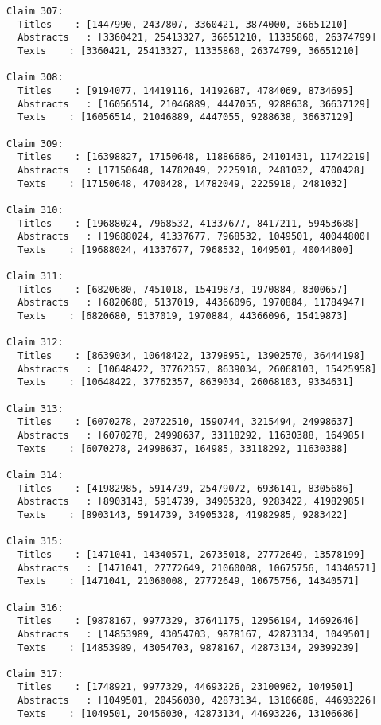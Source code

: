 \documentclass[11pt]{article}
\begin{document}
\begin{Verbatim}[commandchars=\\\{\}]
Claim 307:
  Titles    : [1447990, 2437807, 3360421, 3874000, 36651210]
  Abstracts   : [3360421, 25413327, 36651210, 11335860, 26374799]
  Texts    : [3360421, 25413327, 11335860, 26374799, 36651210]

Claim 308:
  Titles    : [9194077, 14419116, 14192687, 4784069, 8734695]
  Abstracts   : [16056514, 21046889, 4447055, 9288638, 36637129]
  Texts    : [16056514, 21046889, 4447055, 9288638, 36637129]

Claim 309:
  Titles    : [16398827, 17150648, 11886686, 24101431, 11742219]
  Abstracts   : [17150648, 14782049, 2225918, 2481032, 4700428]
  Texts    : [17150648, 4700428, 14782049, 2225918, 2481032]

Claim 310:
  Titles    : [19688024, 7968532, 41337677, 8417211, 59453688]
  Abstracts   : [19688024, 41337677, 7968532, 1049501, 40044800]
  Texts    : [19688024, 41337677, 7968532, 1049501, 40044800]

Claim 311:
  Titles    : [6820680, 7451018, 15419873, 1970884, 8300657]
  Abstracts   : [6820680, 5137019, 44366096, 1970884, 11784947]
  Texts    : [6820680, 5137019, 1970884, 44366096, 15419873]

Claim 312:
  Titles    : [8639034, 10648422, 13798951, 13902570, 36444198]
  Abstracts   : [10648422, 37762357, 8639034, 26068103, 15425958]
  Texts    : [10648422, 37762357, 8639034, 26068103, 9334631]

Claim 313:
  Titles    : [6070278, 20722510, 1590744, 3215494, 24998637]
  Abstracts   : [6070278, 24998637, 33118292, 11630388, 164985]
  Texts    : [6070278, 24998637, 164985, 33118292, 11630388]

Claim 314:
  Titles    : [41982985, 5914739, 25479072, 6936141, 8305686]
  Abstracts   : [8903143, 5914739, 34905328, 9283422, 41982985]
  Texts    : [8903143, 5914739, 34905328, 41982985, 9283422]

Claim 315:
  Titles    : [1471041, 14340571, 26735018, 27772649, 13578199]
  Abstracts   : [1471041, 27772649, 21060008, 10675756, 14340571]
  Texts    : [1471041, 21060008, 27772649, 10675756, 14340571]

Claim 316:
  Titles    : [9878167, 9977329, 37641175, 12956194, 14692646]
  Abstracts   : [14853989, 43054703, 9878167, 42873134, 1049501]
  Texts    : [14853989, 43054703, 9878167, 42873134, 29399239]

Claim 317:
  Titles    : [1748921, 9977329, 44693226, 23100962, 1049501]
  Abstracts   : [1049501, 20456030, 42873134, 13106686, 44693226]
  Texts    : [1049501, 20456030, 42873134, 44693226, 13106686]


\end{Verbatim}
\end{document}
